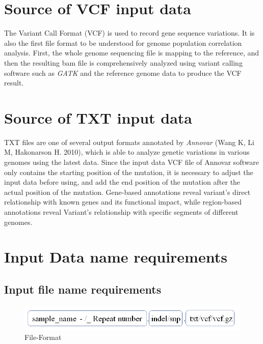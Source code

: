 \documentclass[
]{book}
\theoremstyle{definition}
\theoremstyle{definition}
\theoremstyle{definition}
\theoremstyle{definition}
\theoremstyle{remark}
\begin{document}
\hypertarget{source-of-vcf-input-data}{%
\section{Source of VCF input data}\label{source-of-vcf-input-data}}

The Variant Call Format (VCF) is used to record gene sequence variations. It is also the first file format to be understood for genome population correlation analysis. First, the whole genome sequencing file is mapping to the reference, and then the resulting bam file is comprehensively analyzed using variant calling software such as \emph{GATK} and the reference genome data to produce the VCF result.

\hypertarget{source-of-txt-input-data}{%
\section{Source of TXT input data}\label{source-of-txt-input-data}}

TXT files are one of several output formats annotated by \emph{Annovar} (Wang K, Li M, Hakonarson H. 2010), which is able to analyze genetic variations in various genomes using the latest data. Since the input data VCF file of Annovar software only contains the starting position of the mutation, it is necessary to adjust the input data before using, and add the end position of the mutation after the actual position of the mutation. Gene-based annotations reveal variant's direct relationship with known genes and its functional impact, while region-based annotations reveal Variant's relationship with specific segments of different genomes.

\hypertarget{input-data-name-requirements}{%
\section{Input Data name requirements}\label{input-data-name-requirements}}

\hypertarget{input-file-name-requirements}{%
\subsection{Input file name requirements}\label{input-file-name-requirements}}

\begin{figure}
\includegraphics[width=0.8\linewidth]{figure/Input_File_Format} \caption{File-Format}\label{fig:unnamed-chunk-4}
\end{figure}
\end{document}
